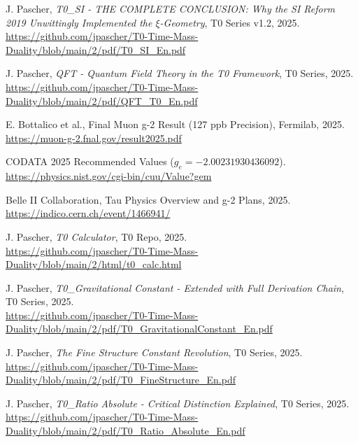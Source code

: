 \documentclass[12pt,a4paper]{article}
\theoremstyle{definition}
\begin{document}
	
	\begin{thebibliography}{99}
		 J. Pascher, \textit{T0\_SI - THE COMPLETE CONCLUSION: Why the SI Reform 2019 Unwittingly Implemented the $\xi$-Geometry}, T0 Series v1.2, 2025. \\
		\url{https://github.com/jpascher/T0-Time-Mass-Duality/blob/main/2/pdf/T0_SI_En.pdf}
		
		 J. Pascher, \textit{QFT - Quantum Field Theory in the T0 Framework}, T0 Series, 2025. \\
		\url{https://github.com/jpascher/T0-Time-Mass-Duality/blob/main/2/pdf/QFT_T0_En.pdf}
		
		 E. Bottalico et al., Final Muon g-2 Result (127 ppb Precision), Fermilab, 2025. \\
		\url{https://muon-g-2.fnal.gov/result2025.pdf}
		
		 CODATA 2025 Recommended Values ($g_e = -2.00231930436092$). \\
		\url{https://physics.nist.gov/cgi-bin/cuu/Value?gem}
		
		 Belle II Collaboration, Tau Physics Overview and g-2 Plans, 2025. \\
		\url{https://indico.cern.ch/event/1466941/}
		
		 J. Pascher, \textit{T0 Calculator}, T0 Repo, 2025. \\
		\url{https://github.com/jpascher/T0-Time-Mass-Duality/blob/main/2/html/t0_calc.html}
		
		 J. Pascher, \textit{T0\_Gravitational Constant - Extended with Full Derivation Chain}, T0 Series, 2025. \\
		\url{https://github.com/jpascher/T0-Time-Mass-Duality/blob/main/2/pdf/T0_GravitationalConstant_En.pdf}
		
		 J. Pascher, \textit{The Fine Structure Constant Revolution}, T0 Series, 2025. \\
		\url{https://github.com/jpascher/T0-Time-Mass-Duality/blob/main/2/pdf/T0_FineStructure_En.pdf}
		
		 J. Pascher, \textit{T0\_Ratio Absolute - Critical Distinction Explained}, T0 Series, 2025. \\
		\url{https://github.com/jpascher/T0-Time-Mass-Duality/blob/main/2/pdf/T0_Ratio_Absolute_En.pdf}
		

\end{thebibliography}
\end{document}
